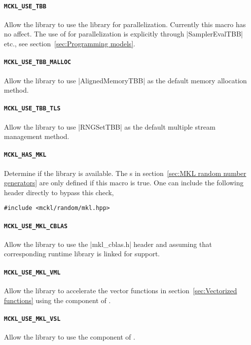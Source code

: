 \paragraph{\texttt{MCKL\_USE\_TBB}} Allow the library to use the \tbb library
for parallelization. Currently this macro has no affect. The use of \tbb for
parallelization is explicitly through |SamplerEvalTBB| etc., see
section~\ref{sec:Programming models}.

\paragraph{\texttt{MCKL\_USE\_TBB\_MALLOC}} Allow the library to use
|AlignedMemoryTBB| as the default memory allocation method.

\paragraph{\texttt{MCKL\_USE\_TBB\_TLS}} Allow the library to use |RNGSetTBB|
as the default multiple \rng stream management method.

\paragraph{\texttt{MCKL\_HAS\_MKL}} Determine if the \mkl library is available.
The \rng{}s in section~\ref{sec:MKL random number generators} are only defined
if this macro is true. One can include the following header directly to bypass
this check,
\begin{verbatim}
#include <mckl/random/mkl.hpp>
\end{verbatim}

\paragraph{\texttt{MCKL\_USE\_MKL\_CBLAS}} Allow the library to use the
|mkl_cblas.h| header and assuming that corresponding runtime library is linked
for \blas support.

\paragraph{\texttt{MCKL\_USE\_MKL\_VML}} Allow the library to accelerate the
vector functions in section~\ref{sec:Vectorized functions} using the \vml
component of \mkl.

\paragraph{\texttt{MCKL\_USE\_MKL\_VSL}} Allow the library to use the \vsl
component of \mkl.

